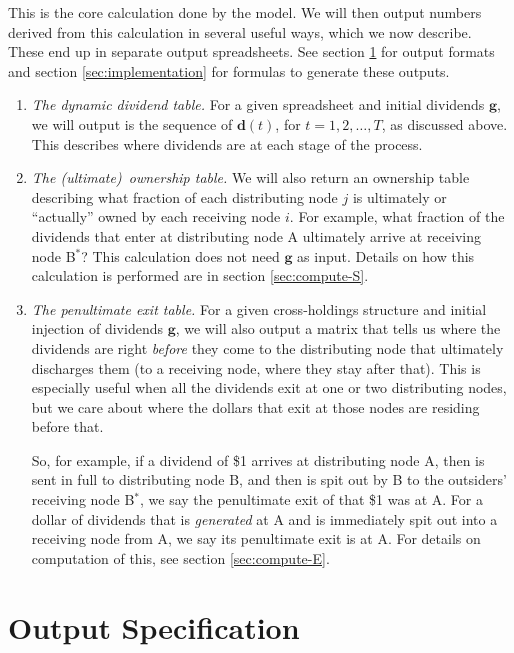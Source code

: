 \documentclass[a4paper,12pt,reqno]{amsart}
\theoremstyle{definition} \newtheorem{example}{Example}
\theoremstyle{definition} \newtheorem{condition}{Condition}
\theoremstyle{definition} \newtheorem{corollary}{Corollary}
\theoremstyle{definition} \newtheorem{claim}{Claim}
\theoremstyle{definition} \newtheorem{definition}{Definition}
\theoremstyle{definition} \newtheorem{conjecture}{Conjecture}
\theoremstyle{definition} \newtheorem{lemma}{Lemma}
\theoremstyle{definition} \newtheorem{theorem}{Theorem}
\theoremstyle{definition} \newtheorem*{theoremNoNumber}{Theorem}
\theoremstyle{definition} \newtheorem*{lemmaCorrespondence}{Lemma \ref{lem:correspondence}}
\theoremstyle{definition}\newtheorem{proposition}{Proposition}
\theoremstyle{definition} \newtheorem{result}{Result}
\theoremstyle{definition} \newtheorem*{definitionNoNumber}{Definition}
\theoremstyle{definition} \newtheorem{assumption}{Assumption}
\theoremstyle{definition} \newtheorem*{assumptionNoNumber}{Assumption}
\theoremstyle{definition} \newtheorem*{fact}{Fact}
\theoremstyle{definition} \newtheorem*{property}{Property}
\theoremstyle{definition} \newtheorem{remark}{Remark}
\begin{document}
This is the core calculation done by the model. We will then output numbers derived from this calculation in several useful ways, which we now describe. These end up in separate output spreadsheets. See section \ref{sec:output-spec} for output formats and section \ref{sec:implementation} for formulas to generate these outputs.


\begin{enumerate}
\item \emph{The dynamic dividend table.} For a given spreadsheet and initial dividends $\mathbf{g}$, we will output is the sequence of $\mathbf{d}(t)$, for $t=1,2,\ldots,T$, as discussed above. This describes where dividends are at each stage of the process.


\item \emph{The (ultimate)\ ownership  table.} We will also return an ownership table describing what fraction of each distributing node $j$ is ultimately or ``actually'' owned by each receiving node $i$. For example, what fraction of the dividends that enter at distributing node A ultimately arrive at receiving node B$^*$?  This calculation does not need $\mathbf{g}$ as input. Details on how this calculation is performed are in section \ref{sec:compute-S}.

\item \emph{The penultimate exit table.} For a given cross-holdings structure and initial injection of dividends $\mathbf{g}$, we will also output a matrix that tells us where the dividends are right  \emph{before} they come to the distributing node that ultimately discharges them (to a receiving node, where they stay after that). This is especially useful when all the dividends exit at one or two distributing nodes, but we care about where the dollars that exit at those nodes are residing before that.

So, for example, if a dividend of \$1 arrives at distributing node A, then is sent in full to distributing node B, and then is spit out by B to the outsiders' receiving node B$^\text{*}$, we say the penultimate exit of that \$1 was at A. For a dollar of dividends that is \emph{generated} at A and is immediately spit out into a receiving node from A, we say its penultimate exit is at A. For details on computation of this, see section \ref{sec:compute-E}. 

\end{enumerate}

\section{Output Specification} \label{sec:output-spec}
\end{document}
